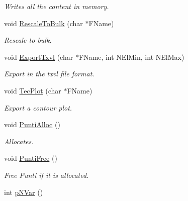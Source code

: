 \begin{DoxyCompactItemize}
\begin{DoxyCompactList}\small\item\em Writes all the content in memory. \end{DoxyCompactList}\item 
void \hyperlink{classVarDatFile_a50acf56d68429e9660e2bfc4f7530521}{Rescale\+To\+Bulk} (char $\ast$F\+Name)\hypertarget{classVarDatFile_a50acf56d68429e9660e2bfc4f7530521}{}\label{classVarDatFile_a50acf56d68429e9660e2bfc4f7530521}

\begin{DoxyCompactList}\small\item\em Rescale to bulk. \end{DoxyCompactList}\item 
void \hyperlink{classVarDatFile_a87e9980dd97eda060a3dcaddd1d692d4}{Export\+Txvl} (char $\ast$F\+Name, int N\+El\+Min, int N\+El\+Max)\hypertarget{classVarDatFile_a87e9980dd97eda060a3dcaddd1d692d4}{}\label{classVarDatFile_a87e9980dd97eda060a3dcaddd1d692d4}

\begin{DoxyCompactList}\small\item\em Export in the txvl file format. \end{DoxyCompactList}\item 
void \hyperlink{classVarDatFile_ace7cb52bc9334449375e6e0456161120}{Tec\+Plot} (char $\ast$F\+Name)\hypertarget{classVarDatFile_ace7cb52bc9334449375e6e0456161120}{}\label{classVarDatFile_ace7cb52bc9334449375e6e0456161120}

\begin{DoxyCompactList}\small\item\em Export a contour plot. \end{DoxyCompactList}\item 
void \hyperlink{classVarDatFile_a38ef005b54f94a56824e7240876e9c03}{Punti\+Alloc} ()
\begin{DoxyCompactList}\small\item\em Allocates. \end{DoxyCompactList}\item 
void \hyperlink{classVarDatFile_aab87873039820cc1aca0c444c43d9a5e}{Punti\+Free} ()\hypertarget{classVarDatFile_aab87873039820cc1aca0c444c43d9a5e}{}\label{classVarDatFile_aab87873039820cc1aca0c444c43d9a5e}

\begin{DoxyCompactList}\small\item\em Free Punti if it is allocated. \end{DoxyCompactList}\item 
int \hyperlink{classVarDatFile_aff25aa77a033788903eee04852e24cb6}{p\+N\+Var} ()\hypertarget{classVarDatFile_aff25aa77a033788903eee04852e24cb6}{}\label{classVarDatFile_aff25aa77a033788903eee04852e24cb6}


\end{DoxyCompactItemize}

